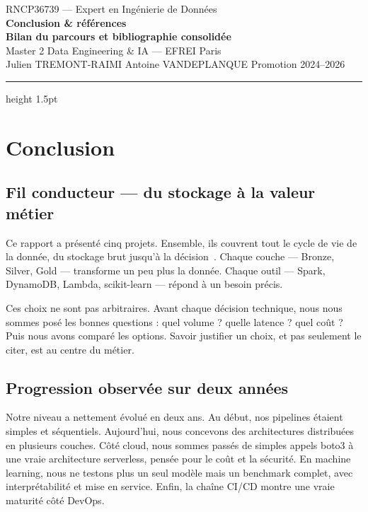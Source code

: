 \documentclass[11pt]{article}
\begin{document}
\thispagestyle{fancy}
\begin{center}
  \vspace*{0.3cm}
  {\small\textcolor{black!55}{RNCP36739 --- Expert en Ingénierie de Données}}\\[6pt]
  {\Huge\bfseries\textcolor{titleNavy}{Conclusion \& références}}\\[8pt]
  {\large\bfseries Bilan du parcours et bibliographie consolidée}\\[10pt]
  {\normalsize Master 2 Data Engineering \& IA --- EFREI Paris}\\[4pt]
  {\small Julien TREMONT-RAIMI \quad\textbullet\quad Antoine VANDEPLANQUE \quad\textbullet\quad Promotion 2024--2026}
\end{center}

\vspace{4pt}
{\color{titleNavy}\hrule height 1.5pt}
\vspace{10pt}

\section{Conclusion}

\subsection{Fil conducteur --- du stockage à la valeur métier}

Ce rapport a présenté cinq projets. Ensemble, ils couvrent tout le cycle de vie de
la donnée, du stockage brut jusqu'à la décision~\cite{rncp}. Chaque couche --- Bronze,
Silver, Gold --- transforme un peu plus la donnée. Chaque outil --- Spark, DynamoDB,
Lambda, scikit-learn --- répond à un besoin précis.

Ces choix ne sont pas arbitraires. Avant chaque décision technique, nous nous sommes
posé les bonnes questions : quel volume ? quelle latence ? quel coût ? Puis nous avons
comparé les options. Savoir justifier un choix, et pas seulement le citer, est au
centre du métier.

\subsection{Progression observée sur deux années}

Notre niveau a nettement évolué en deux ans. Au début, nos pipelines étaient simples
et séquentiels. Aujourd'hui, nous concevons des architectures distribuées en
plusieurs couches. Côté cloud, nous sommes passés de simples appels boto3 à une vraie
architecture serverless, pensée pour le coût et la sécurité. En machine learning,
nous ne testons plus un seul modèle mais un benchmark complet, avec interprétabilité
et mise en service. Enfin, la chaîne CI/CD montre une vraie maturité côté DevOps.
\end{document}
